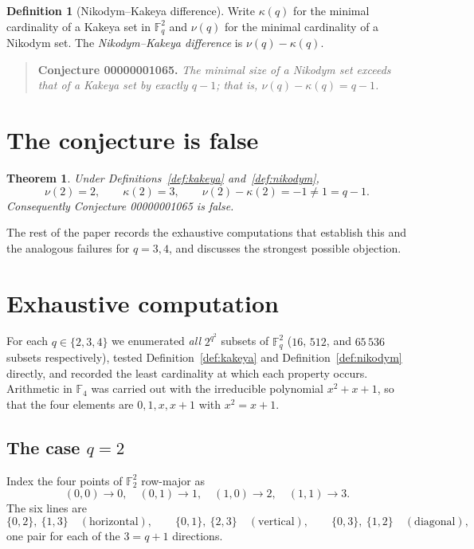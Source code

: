 \documentclass[11pt]{article}
\newtheorem{theorem}{Theorem}
\theoremstyle{definition}
\newtheorem{definition}{Definition}
\theoremstyle{remark}
\begin{document}
\begin{definition}[Nikodym--Kakeya difference]
Write $\kappa(q)$ for the minimal cardinality of a Kakeya set in
$\mathbb{F}_q^2$ and $\nu(q)$ for the minimal cardinality of a Nikodym set.
The \emph{Nikodym--Kakeya difference} is $\nu(q)-\kappa(q)$.
\end{definition}

\begin{quote}
\textbf{Conjecture 00000001065.} \emph{The minimal size of a Nikodym set
exceeds that of a Kakeya set by exactly $q-1$; that is,
$\nu(q)-\kappa(q)=q-1$.}
\end{quote}

\section{The conjecture is false}

\begin{theorem}\label{thm:main}
Under Definitions~\ref{def:kakeya} and~\ref{def:nikodym},
\[
  \nu(2)=2,\qquad \kappa(2)=3,\qquad \nu(2)-\kappa(2)=-1\neq 1=q-1 .
\]
Consequently Conjecture 00000001065 is false.
\end{theorem}

The rest of the paper records the exhaustive computations that establish this
and the analogous failures for $q=3,4$, and discusses the strongest possible
objection.

\section{Exhaustive computation}\label{sec:computation}

For each $q\in\{2,3,4\}$ we enumerated \emph{all} $2^{q^2}$ subsets of
$\mathbb{F}_q^2$ ($16$, $512$, and $65\,536$ subsets respectively), tested
Definition~\ref{def:kakeya} and Definition~\ref{def:nikodym} directly, and
recorded the least cardinality at which each property occurs. Arithmetic in
$\mathbb{F}_4$ was carried out with the irreducible polynomial $x^2+x+1$, so
that the four elements are $0,1,x,x+1$ with $x^2=x+1$.

\subsection{The case $q=2$}

Index the four points of $\mathbb{F}_2^2$ row-major as
\[
  (0,0)\to 0,\quad (0,1)\to 1,\quad (1,0)\to 2,\quad (1,1)\to 3 .
\]
The six lines are
\[
  \{0,2\},\ \{1,3\} \quad(\text{horizontal}),\qquad
  \{0,1\},\ \{2,3\} \quad(\text{vertical}),\qquad
  \{0,3\},\ \{1,2\} \quad(\text{diagonal}),
\]
one pair for each of the $3=q+1$ directions.
\end{document}
